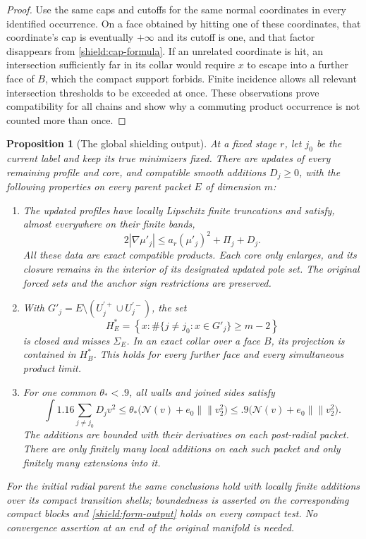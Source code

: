\documentclass[11pt]{article}
\numberwithin{equation}{section}
\newtheorem{proposition}[theorem]{Proposition}
\theoremstyle{definition}
\theoremstyle{remark}
\begin{document}
\begin{proof}
Use the same caps and cutoffs for the same normal coordinates in every
identified occurrence.  On a face obtained by hitting one of these
coordinates, that coordinate's cap is eventually $+\infty$ and its
cutoff is one, and that factor disappears from
\cref{shield:cap-formula}.  If an unrelated coordinate is hit, an
intersection sufficiently far in its collar would require $x$ to
escape into a further face of $B$, which the compact support forbids.
Finite incidence allows all relevant intersection thresholds to be
exceeded at once.  These observations prove compatibility for all
chains and show why a commuting product occurrence is not counted
more than once.
\end{proof}

\begin{proposition}[The global shielding output]\label{shield:global}
At a fixed stage $r$, let $j_0$ be the current label and keep its true
minimizers fixed.  There are updates of every remaining profile and
core, and compatible smooth additions $D_j\ge0$, with the following
properties on every parent packet $E$ of dimension $m$:
\begin{enumerate}[label=\textup{(\roman*)}]
\item The updated profiles have locally Lipschitz finite truncations
and satisfy, almost everywhere on their finite bands,
\begin{equation}\label{shield:profile-output}
 2\left\lvert{\nabla\mu'_j}\right\rvert\le a_r(\mu'_j)^2+\Pi_j+D_j.
\end{equation}
All these data are exact compatible products.  Each core only enlarges,
and its closure remains in the interior of its designated updated pole
set.  The original forced sets and the anchor sign restrictions are
preserved.
\item With $G'_j=E\setminus(U_j^{\prime+}\cup U_j^{\prime-})$, the set
\begin{equation}\label{shield:guard-output}
 H_E^*=\left\{x:\#\{j\ne j_0:x\in G'_j\}\ge m-2\right\}
\end{equation}
is closed and misses $\Sigma_E$.  In an exact collar over a face $B$,
its projection is contained in $H_B^*$.  This holds for every further
face and every simultaneous product limit.
\item For one common $\theta_*<.9$, all walls and joined sides satisfy
\begin{equation}\label{shield:form-output}
 \int 1.16\sum_{j\ne j_0}D_jv^2
 \le\theta_*\bigl(\mathcal N(v)+e_0\left\lVert{}\right\rVert v_2^2\bigr)
 \le .9\bigl(\mathcal N(v)+e_0\left\lVert{}\right\rVert v_2^2\bigr).
\end{equation}
The additions are bounded with their derivatives on each post-radial
packet.  There are only finitely many local additions on each such
packet and only finitely many extensions into it.
\end{enumerate}
For the initial radial parent the same conclusions hold with locally
finite additions over its compact transition shells; boundedness is
asserted on the corresponding compact blocks and
\cref{shield:form-output} holds on every compact test.  No convergence
assertion at an end of the original manifold is needed.
\end{proposition}
\end{document}
